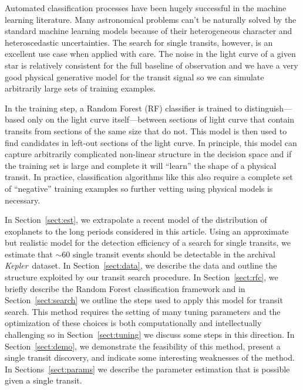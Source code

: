 \documentclass[12pt,preprint]{aastex}
\newcommand{\project}[1]{\textsl{#1}}
\newcommand{\kepler}{\project{Kepler}}
\newcommand{\paper}{article}
\newcommand{\sectionname}{Section}
\newcommand{\sectref}[1]{\ref{sect:#1}}
\newcommand{\Sect}[1]{\sectionname~\sectref{#1}}
\newcommand{\sect}[1]{\Sect{#1}}
\newcommand{\todo}[3]{{\color{#2}\emph{#1}: #3}}
\newcommand{\dfmtodo}[1]{\todo{DFM}{red}{#1}}
\begin{document}
Automated classification processes have been hugely successful in the machine
learning literature.
Many astronomical problems can't be naturally solved by the standard machine
learning models because of their heterogeneous character and heteroscedastic
uncertainties.
The search for single transits, however, is an excellent use case when applied
with care.
The noise in the light curve of a given star is relatively consistent for the
full baseline of observation and we have a very good physical generative model
for the transit signal so we can simulate arbitrarily large sets of training
examples.

In the training step, a Random Forest (RF) classifier is trained to
distinguish---based only on the light curve itself---between sections of light
curve that contain transits from sections of the same size that do not.
This model is then used to find candidates in left-out sections of the light
curve.
In principle, this model can capture arbitrarily complicated non-linear
structure in the decision space and if the training set is large and complete
it will ``learn'' the shape of a physical transit.
In practice, classification algorithms like this also require a complete set
of ``negative'' training examples so further vetting using physical models
is necessary.

In \sect{est}, we extrapolate a recent model of the distribution of exoplanets
to the long periods considered in this \paper.
Using an approximate but realistic model for the detection efficiency of a
search for single transits, we estimate that $\sim 60$ single transit events
should be detectable in the archival \kepler\ dataset.
In \sect{data}, we describe the data and outline the structure exploited by
our transit search procedure.
In \sect{rfc}, we briefly describe the Random Forest classification framework
and in \sect{search} we outline the steps used to apply this model for transit
search.
This method requires the setting of many tuning parameters and the
optimization of these choices is both computationally and intellectually
challenging so in \sect{tuning} we discuss some steps in this direction.
In \sect{demo}, we demonstrate the feasibility of this method, present a
single transit discovery, and indicate some interesting weaknesses of the
method.
In \sectionname s~\sectref{params} we describe the parameter estimation that
is possible given a single transit.

\end{document}
